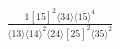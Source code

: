 \documentclass[varwidth, border=5pt]{standalone}
\begin{document}
\begin{my}
$\begin{gathered}
\scriptscriptstyle\frac{1[15]^2⟨34⟩⟨15⟩^4}{⟨13⟩⟨14⟩^2⟨24⟩[25]^2⟨35⟩^2}
\end{gathered}$
\end{my}
\end{document}
